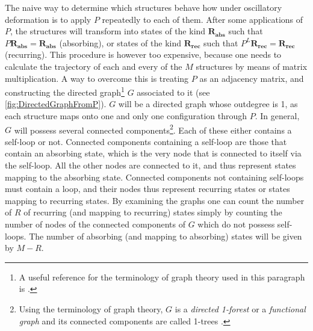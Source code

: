 The naive way to determine which structures behave how under oscillatory deformation is to apply $P$ repeatedly to each of them. After some applications of $P$, the structures will transform into states of the kind $\mathbf{R_{abs}}$ such that $P \mathbf{R_{abs}} = \mathbf{R_{abs}}$ (absorbing), or states of the kind $\mathbf{R_{rec}}$ such that $P^{L} \mathbf{R_{rec}} = \mathbf{R_{rec}}$ (recurring). This procedure is however too expensive, because one needs to calculate the trajectory of each and every of the $M$ structures by means of matrix multiplication. 
A way to overcome this is treating $P$ as an adjacency matrix, and constructing the directed graph\footnote{A useful reference for the terminology of graph theory used in this paragraph is \cite{bollobas1998modern}.} $G$ associated to it (see \autoref{fig:DirectedGraphFromP}). $G$ will be a directed graph whose outdegree is 1, as each structure maps onto one and only one configuration through $P$. In general, $G$ will possess several connected components\footnote{Using the terminology of graph theory, $G$ is a \emph{directed 1-forest} or a \emph{functional graph} and its connected components are called 1-trees \cite{bollobas1998modern}.}. Each of these either contains a self-loop or not. Connected components containing a self-loop are those that contain an absorbing state, which is the very node that is connected to itself via the self-loop. All the other nodes are connected to it, and thus represent states mapping to the absorbing state. Connected components not containing self-loops must contain a loop, and their nodes thus represent recurring states or states mapping to recurring states. By examining the graphs one can count the number of $R$ of recurring (and mapping to recurring) states simply by counting the number of nodes of the connected components of $G$ which do not possess self-loops. The number of absorbing (and mapping to absorbing) states will be given by $M-R$.

